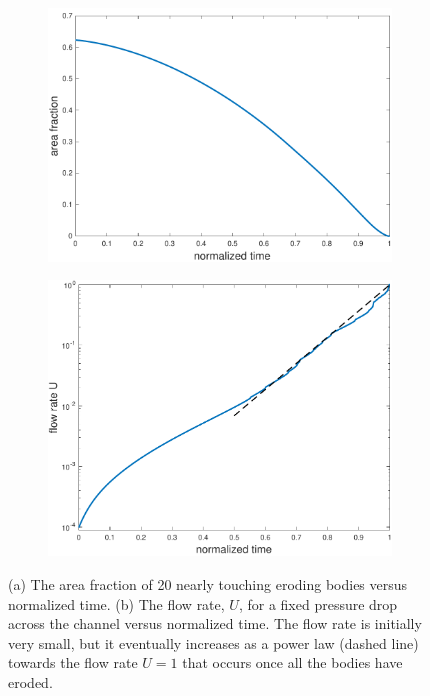 \documentclass[preprint,10pt]{elsarticle}
\begin{document}
\begin{figure}[H]
\begin{subfigure}[b]{0.5\textwidth}
\includegraphics*[height = 0.7\linewidth]{./figs/porosity20dense}
\caption{}
\end{subfigure}
\begin{subfigure}[b]{0.5\textwidth}
\includegraphics*[height = 0.7\linewidth]{./figs/flow_rate20densen}
\caption{}
\end{subfigure}
\caption{\label{fig:Eroding20flowrate}(a) The area fraction of 20
nearly touching eroding bodies versus normalized time. (b) The flow
rate, $U$, for a fixed pressure drop across the channel versus
normalized time.  The flow rate is initially very small, but it
eventually increases as a power law (dashed line) towards the flow rate
$U=1$ that occurs once all the bodies have eroded.}
\end{figure}
\end{document}
